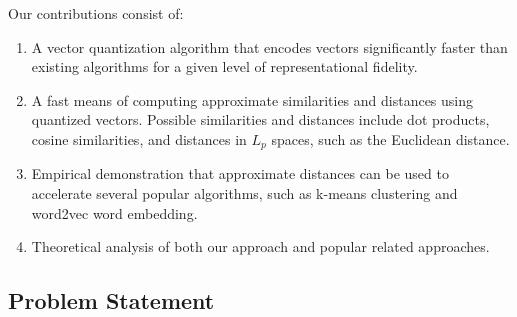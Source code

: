 Our contributions consist of:
\begin{enumerate}
\item A vector quantization algorithm that encodes vectors significantly faster than existing algorithms for a given level of representational fidelity.
\item A fast means of computing approximate similarities and distances using quantized vectors. Possible similarities and distances include dot products, cosine similarities, and distances in $L_p$ spaces, such as the Euclidean distance.
\item Empirical demonstration that approximate distances can be used to accelerate several popular algorithms, such as k-means clustering and word2vec word embedding.
\item Theoretical analysis of both our approach and popular related approaches.
\end{enumerate}















\subsection{Problem Statement}




